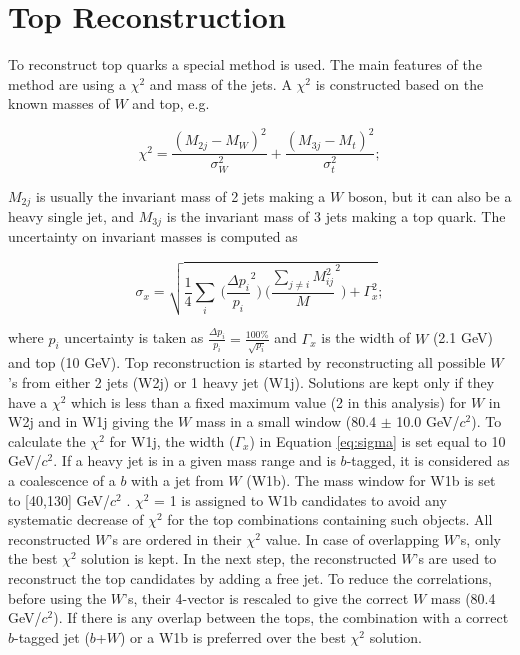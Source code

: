\section{Top Reconstruction}
\label{sect:top}
To reconstruct top quarks a special method is used.  
The main features 
of the method are using a $\chi^2$ and mass of the jets. A $\chi^2$ is
constructed based on the known masses of $W$ and top, e.g.
\begin{linenomath}
\begin{equation}
\label{eq:chi2}
\chi^2 = \frac{(M_{2j} - M_W)^2}{\sigma^2_W} + \frac{(M_{3j} - M_t)^2}{\sigma^2_t}; 
\end{equation}
\end{linenomath}
$M_{2j}$ is usually the invariant mass of 2 jets making a $W$ boson, 
but it can also be a heavy single jet, and $M_{3j}$ is the invariant mass of 3 jets making a top quark. The uncertainty on invariant masses is computed as
\begin{linenomath}
\begin{equation}
\label{eq:sigma}
\sigma_x = \sqrt{\frac{1}{4}\sum_{i} \pod{\frac{\Delta p_i}{p_i}}^2\pod{\frac{\sum_{j \neq i} M_{ij}^2}{M}}^2 + \Gamma_x^2}; 
\end{equation}
\end{linenomath}
where $p_i$ uncertainty is taken as $\frac{\Delta p_i}{p_i} = \frac{100\%}{\sqrt{p_i}}$ and $\Gamma_x$ is the width of $W$ (2.1 GeV) 
and top (10 GeV). Top reconstruction is started by reconstructing all possible $W$'s from either 2 jets (W2j) or 1 heavy jet (W1j).
Solutions are kept only if they have a $\chi^2$ which is less than a fixed maximum value (2 in this analysis) for $W$ in W2j
and in W1j giving the $W$ mass in a small window (80.4 $\pm$ 10.0 GeV/$c^2$). To calculate the $\chi^2$ for W1j, the width ($\Gamma_x$) in 
Equation \ref{eq:sigma} is set equal to 10 GeV/$c^2$. If a heavy jet is in a given mass range and is $b$-tagged, 
it is considered as a coalescence of a $b$ with a jet from $W$ (W1b). The mass window for W1b is set to [40,130] GeV/$c^2$ . 
$\chi^2$ = 1 is assigned to W1b candidates to avoid any systematic decrease of $\chi^2$ for the top combinations containing such objects.
All reconstructed $W$'s are ordered in their $\chi^2$ value. In case of overlapping $W$'s, only the best $\chi^2$ solution is kept. 
In the next step, the reconstructed $W$'s are used to reconstruct the top candidates by adding a free jet. To reduce the correlations,
before using the $W$'s, their 4-vector is rescaled to give the correct $W$ mass (80.4 GeV/$c^2$). If there is any overlap between the tops, 
the combination with a correct $b$-tagged jet ($b$+$W$) or a W1b is preferred over the best $\chi^2$ solution. 

